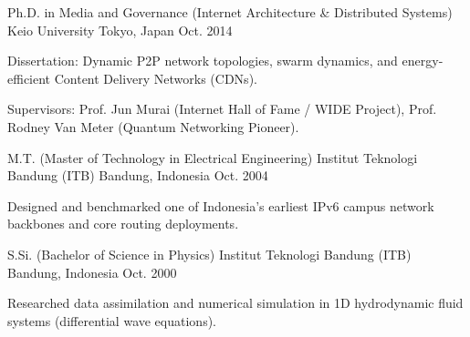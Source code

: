 

\begin{cventries}

  \cventry
    {Ph.D. in Media and Governance (Internet Architecture \& Distributed Systems)} %
    {Keio University} %
    {Tokyo, Japan} %
    {Oct. 2014} %
    {
      \begin{cvitems} %
        \item {Dissertation: Dynamic P2P network topologies, swarm dynamics, and energy-efficient Content Delivery Networks (CDNs).}
        \item {Supervisors: Prof. Jun Murai (Internet Hall of Fame / WIDE Project), Prof. Rodney Van Meter (Quantum Networking Pioneer).}
      \end{cvitems}
    }

  \cventry
    {M.T. (Master of Technology in Electrical Engineering)} %
    {Institut Teknologi Bandung (ITB)} %
    {Bandung, Indonesia} %
    {Oct. 2004} %
    {
      \begin{cvitems}
        \item {Designed and benchmarked one of Indonesia's earliest IPv6 campus network backbones and core routing deployments.}
      \end{cvitems}
    }

  \cventry
    {S.Si. (Bachelor of Science in Physics)} %
    {Institut Teknologi Bandung (ITB)} %
    {Bandung, Indonesia} %
    {Oct. 2000} %
    {
      \begin{cvitems}
        \item {Researched data assimilation and numerical simulation in 1D hydrodynamic fluid systems (differential wave equations).}
      \end{cvitems}
    }

\end{cventries}
